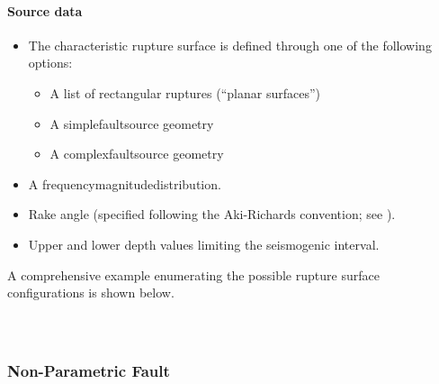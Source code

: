 \paragraph{Source data}
\begin{itemize}
    \item The characteristic rupture surface is defined through one of the
    following options:
        \begin{itemize}
            \item A list of rectangular ruptures (``planar surfaces'')
            \item A \gls{simplefaultsource} geometry
            \item A \gls{complexfaultsource} geometry
        \end{itemize}
    \item A \gls{frequencymagnitudedistribution}.
    \item Rake angle (specified following the Aki-Richards convention; see
          \citet{aki2002}).
    \item Upper and lower depth values limiting the seismogenic interval.
\end{itemize}

A comprehensive example enumerating the possible rupture surface configurations is shown below. 

\inputminted[firstline=1,firstnumber=1,fontsize=\footnotesize,frame=single,linenos,bgcolor=lightgray]{xml}{oqum/hazard/verbatim/input_characteristic_fault_simple.xml}

\inputminted[firstline=1,firstnumber=1,fontsize=\footnotesize,frame=single,linenos,bgcolor=lightgray]{xml}{oqum/hazard/verbatim/input_characteristic_fault_complex.xml}

\inputminted[firstline=1,firstnumber=1,fontsize=\footnotesize,frame=single,linenos,bgcolor=lightgray]{xml}{oqum/hazard/verbatim/input_characteristic_fault_planar.xml}

\subsubsection{Non-Parametric Fault}
\label{desc_nonparametric_fault}

